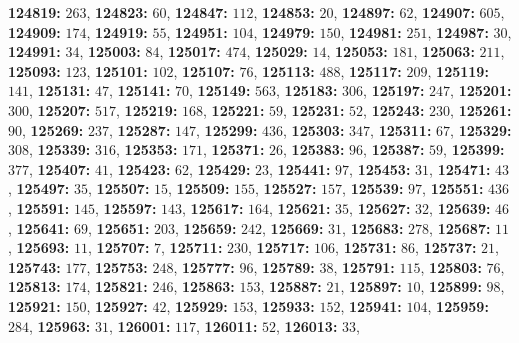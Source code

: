 \textsf{\bfseries 124819:} $263$, \textsf{\bfseries 124823:} $60$, \textsf{\bfseries 124847:} $112$, \textsf{\bfseries 124853:} $20$, \textsf{\bfseries 124897:} $62$, \textsf{\bfseries 124907:} $605$, \textsf{\bfseries 124909:} $174$, \textsf{\bfseries 124919:} $55$, \textsf{\bfseries 124951:} $104$, \textsf{\bfseries 124979:} $150$, \textsf{\bfseries 124981:} $251$, \textsf{\bfseries 124987:} $30$, \textsf{\bfseries 124991:} $34$, \textsf{\bfseries 125003:} $84$, \textsf{\bfseries 125017:} $474$, \textsf{\bfseries 125029:} $14$, \textsf{\bfseries 125053:} $181$, \textsf{\bfseries 125063:} $211$, \textsf{\bfseries 125093:} $123$, \textsf{\bfseries 125101:} $102$, \textsf{\bfseries 125107:} $76$, \textsf{\bfseries 125113:} $488$, \textsf{\bfseries 125117:} $209$, \textsf{\bfseries 125119:} $141$, \textsf{\bfseries 125131:} $47$, \textsf{\bfseries 125141:} $70$, \textsf{\bfseries 125149:} $563$, \textsf{\bfseries 125183:} $306$, \textsf{\bfseries 125197:} $247$, \textsf{\bfseries 125201:} $300$, \textsf{\bfseries 125207:} $517$, \textsf{\bfseries 125219:} $168$, \textsf{\bfseries 125221:} $59$, \textsf{\bfseries 125231:} $52$, \textsf{\bfseries 125243:} $230$, \textsf{\bfseries 125261:} $90$, \textsf{\bfseries 125269:} $237$, \textsf{\bfseries 125287:} $147$, \textsf{\bfseries 125299:} $436$, \textsf{\bfseries 125303:} $347$, \textsf{\bfseries 125311:} $67$, \textsf{\bfseries 125329:} $308$, \textsf{\bfseries 125339:} $316$, \textsf{\bfseries 125353:} $171$, \textsf{\bfseries 125371:} $26$, \textsf{\bfseries 125383:} $96$, \textsf{\bfseries 125387:} $59$, \textsf{\bfseries 125399:} $377$, \textsf{\bfseries 125407:} $41$, \textsf{\bfseries 125423:} $62$, \textsf{\bfseries 125429:} $23$, \textsf{\bfseries 125441:} $97$, \textsf{\bfseries 125453:} $31$, \textsf{\bfseries 125471:} $43$, \textsf{\bfseries 125497:} $35$, \textsf{\bfseries 125507:} $15$, \textsf{\bfseries 125509:} $155$, \textsf{\bfseries 125527:} $157$, \textsf{\bfseries 125539:} $97$, \textsf{\bfseries 125551:} $436$, \textsf{\bfseries 125591:} $145$, \textsf{\bfseries 125597:} $143$, \textsf{\bfseries 125617:} $164$, \textsf{\bfseries 125621:} $35$, \textsf{\bfseries 125627:} $32$, \textsf{\bfseries 125639:} $46$, \textsf{\bfseries 125641:} $69$, \textsf{\bfseries 125651:} $203$, \textsf{\bfseries 125659:} $242$, \textsf{\bfseries 125669:} $31$, \textsf{\bfseries 125683:} $278$, \textsf{\bfseries 125687:} $11$, \textsf{\bfseries 125693:} $11$, \textsf{\bfseries 125707:} $7$, \textsf{\bfseries 125711:} $230$, \textsf{\bfseries 125717:} $106$, \textsf{\bfseries 125731:} $86$, \textsf{\bfseries 125737:} $21$, \textsf{\bfseries 125743:} $177$, \textsf{\bfseries 125753:} $248$, \textsf{\bfseries 125777:} $96$, \textsf{\bfseries 125789:} $38$, \textsf{\bfseries 125791:} $115$, \textsf{\bfseries 125803:} $76$, \textsf{\bfseries 125813:} $174$, \textsf{\bfseries 125821:} $246$, \textsf{\bfseries 125863:} $153$, \textsf{\bfseries 125887:} $21$, \textsf{\bfseries 125897:} $10$, \textsf{\bfseries 125899:} $98$, \textsf{\bfseries 125921:} $150$, \textsf{\bfseries 125927:} $42$, \textsf{\bfseries 125929:} $153$, \textsf{\bfseries 125933:} $152$, \textsf{\bfseries 125941:} $104$, \textsf{\bfseries 125959:} $284$, \textsf{\bfseries 125963:} $31$, \textsf{\bfseries 126001:} $117$, \textsf{\bfseries 126011:} $52$, \textsf{\bfseries 126013:} $33$, 
